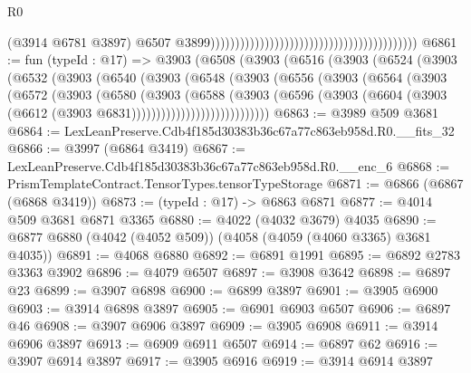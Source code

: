 \begin{lexlean}{R0}
\begin{coremodule}
                                                                                        (@3914
                                                                                          @6781
                                                                                          @3897)
                                                                                        @6507
                                                                                        @3899))))))))))))))))))))))))))))))))))))))))))
@6861 := fun (typeId : @17) =>
  @3903
    (@6508
      (@3903
        (@6516
          (@3903
            (@6524
              (@3903
                (@6532
                  (@3903
                    (@6540
                      (@3903
                        (@6548
                          (@3903
                            (@6556
                              (@3903
                                (@6564
                                  (@3903
                                    (@6572
                                      (@3903
                                        (@6580
                                          (@3903
                                            (@6588
                                              (@3903
                                                (@6596
                                                  (@3903
                                                    (@6604
                                                      (@3903
                                                        (@6612
                                                          (@3903 @6831))))))))))))))))))))))))))))
@6863 := @3989 @509 @3681
@6864 := LexLeanPreserve.Cdb4f185d30383b36c67a77c863eb958d.R0.__fits_32
@6866 := @3997 (@6864 @3419)
@6867 := LexLeanPreserve.Cdb4f185d30383b36c67a77c863eb958d.R0.__enc_6
@6868 := PrismTemplateContract.TensorTypes.tensorTypeStorage
@6871 := @6866 (@6867 (@6868 @3419))
@6873 := (typeId : @17) -> @6863 @6871
@6877 := @4014 @509 @3681 @6871 @3365
@6880 := @4022 (@4032 @3679) @4035
@6890 := @6877 @6880 (@4042 (@4052 @509)) (@4058 (@4059 (@4060 @3365) @3681 @4035))
@6891 := @4068 @6880
@6892 := @6891 @1991
@6895 := @6892 @2783 @3363 @3902
@6896 := @4079 @6507
@6897 := @3908 @3642
@6898 := @6897 @23
@6899 := @3907 @6898
@6900 := @6899 @3897
@6901 := @3905 @6900
@6903 := @3914 @6898 @3897
@6905 := @6901 @6903 @6507
@6906 := @6897 @46
@6908 := @3907 @6906 @3897
@6909 := @3905 @6908
@6911 := @3914 @6906 @3897
@6913 := @6909 @6911 @6507
@6914 := @6897 @62
@6916 := @3907 @6914 @3897
@6917 := @3905 @6916
@6919 := @3914 @6914 @3897

\end{coremodule}
\end{lexlean}
